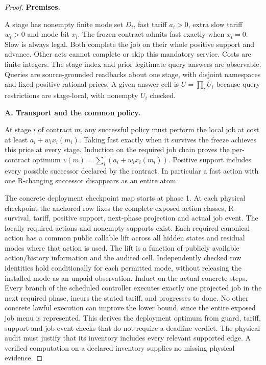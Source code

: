 \begin{proof}

\textbf{Premises.}

A stage has nonempty finite mode set \(D_i\), fast tariff \(a_i>0\), extra slow tariff \(w_i>0\) and mode bit \(x_i\). The frozen contract admits fast exactly when \(x_i=0\). Slow is always legal. Both complete the job on their whole positive support and advance. Other acts cannot complete or skip this mandatory service. Costs are finite integers. The stage index and prior legitimate query answers are observable. Queries are source-grounded readbacks about one stage, with disjoint namespaces and fixed positive rational prices. A given answer cell is \(U=\prod_i U_i\) because query restrictions are stage-local, with nonempty \(U_i\) checked.

\textbf{A. Transport and the common policy.}

At stage \(i\) of contract \(m\), any successful policy must perform the local job at cost at least \(a_i+w_i x_i(m_i)\). Taking fast exactly when it survives the freeze achieves this price at every stage. Induction on the required job chain proves the per-contract optimum \(v(m)=\sum_i(a_i+w_i x_i(m_i))\). Positive support includes every possible successor declared by the contract. In particular a fast action with one R-changing successor disappears as an entire atom.

The concrete deployment checkpoint map starts at phase 1. At each physical checkpoint the anchored row fixes the complete exposed action classes, R-survival, tariff, positive support, next-phase projection and actual job event. The locally required actions and nonempty supports exist. Each required canonical action has a common public callable lift across all hidden states and residual modes where that action is used. The lift is a function of publicly available action/history information and the audited cell. Independently checked row identities hold conditionally for each permitted mode, without releasing the installed mode as an unpaid observation. Induct on the actual concrete steps. Every branch of the scheduled controller executes exactly one projected job in the next required phase, incurs the stated tariff, and progresses to done. No other concrete lawful execution can improve the lower bound, since the entire exposed job menu is represented. This derives the deployment optimum from guard, tariff, support and job-event checks that do not require a deadline verdict. The physical audit must justify that its inventory includes every relevant supported edge. A verified computation on a declared inventory supplies no missing physical evidence.


\end{proof}
